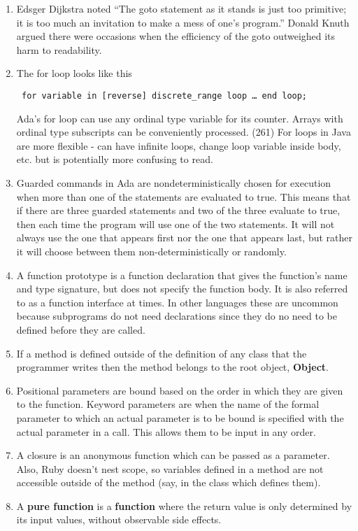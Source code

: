 \documentclass{article}
\begin{document}
\begin{enumerate}
\item Edsger Dijkstra noted “The goto statement as it stands is just too primitive; it is too much an invitation to make a mess of one’s program.” Donald Knuth argued there were occasions when the efficiency of the goto outweighed its harm to readability.
\item The for loop looks like this
\begin{lstlisting} for variable in [reverse] discrete_range loop … end loop; \end{lstlisting}
Ada’s for loop can use any ordinal type variable for its counter. Arrays with ordinal type subscripts can be conveniently processed. (261) For loops in Java are more flexible - can have infinite loops, change loop variable inside body, etc. but is potentially more confusing to read.
\item Guarded commands in Ada are nondeterministically chosen for execution when more than one of the statements are evaluated to true. This means that if there are three guarded statements and two of the three evaluate to true, then each time the program will use one of the two statements. It will not always use the one that appears first nor the one that appears last, but rather it will choose between them non-deterministically or randomly.
\item A function prototype is a function declaration that gives the function's name and type signature, but does not specify the function body. It is also referred to as a function interface at times. In other languages these are uncommon because subprograms do not need declarations since they do no need to be defined before they are called. 
\item If a method is defined outside of the definition of any class that the programmer writes then the method belongs to the root object, \textbf{Object}.
\item Positional parameters are bound based on the order in which they are given to the function. Keyword parameters are when the name of the formal parameter to which an actual parameter is to be bound is specified with the actual parameter in a call. This allows them to be input in any order.
\item A closure is an anonymous function which can be passed as a parameter. Also, Ruby doesn't nest scope, so variables defined in a method are not accessible outside of the method (say, in the class which defines them).
\item A \textbf{pure function} is a \textbf{function} where the return value is only determined by its input values, without observable side effects.

\end{enumerate}
\end{document}
